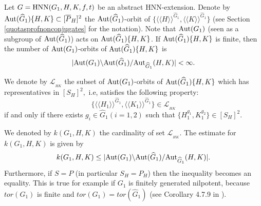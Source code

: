 \documentclass[a4paper,12pt]{article}
\def\aut {{\rm Aut}}
\def\hnn {{\rm HNN}}
\newtheorem{rem}[thm]{Remark}
\begin{document}
{%

\bigskip
 Let $G=\hnn(G_1, H, K, f, t)$ be an abstract HNN-extension. Denote by $\aut(\widehat G_1)\{H,K\}  \subset [\overline{P}_H]^2$ the $\aut(\widehat G_1)$-orbit of $\{ \langle\langle H\rangle\rangle^{\widehat G_1} , \langle\langle K\rangle\rangle^{\widehat G_1} \}$ (see Section \ref{quotasprofnonconjugates} for the notation). Note that $\aut(G_1)$ (seen as a subgroup of $\aut(\widehat G_1)$) acts on $\aut(\widehat G_1)\{H,K\} $. If $\aut(\widehat G_1)\{H,K\}$ is finite, then   the number of $\aut(G_1)$-orbits of $\aut(\widehat G_1)\{H,K\}$ is
$$|\aut(G_1)\backslash \aut(\widehat G_1)/\aut_{\widehat G_1}(H, K)| < \infty.$$
 
 We denote by $\mathscr{L}_{_{HK}}$ the subset of $\aut(G_1)$-orbits of $\aut(\widehat G_1)\{H,K\}$  which has representatives in $[S_H]^2,$ i.e, satisfies the following property: $$\{ \langle\langle H_1 \rangle\rangle^{\widehat G_1} , \langle\langle K_1\rangle\rangle^{\widehat G_1} \} \in \mathscr{L}_{_{HK}}$$ if and only if  there exists $g_i\in \widehat G_1 (i=1,2)$ such that $\{H_1^{g_1}, K_1^{g_2}\} \in [S_H]^2$. 
 
We denoted by $k(G_1,H,K)$ the cardinality of set  $\mathscr{L}_{_{HK}}$. The estimate for $k(G_1,H,K)$ is given by 
$$k(G_1,H,K)\leq |\aut(G_1)\backslash \aut(\widehat G_1)/\aut_{\widehat G_1}(H, K)|.$$
Furthermore, if $S=P$ (in particular $S_H = P_H$)  then the inequality becomes an equality. This is true for example if $G_1$ is finitely generated nilpotent, because $tor(G_1)$ is finite  and $tor(G_1)=tor(\widehat{G}_1)$ (see Corollary 4.7.9 in \cite{RZ}).



}
\end{document}
